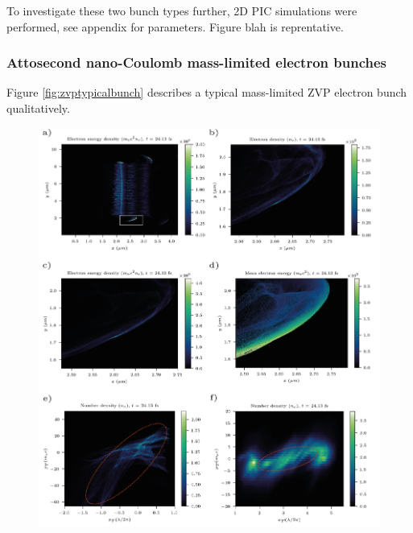  To investigate these two bunch types further, 2D PIC simulations were performed, see appendix for parameters. Figure blah is reprentative.
 
 \subsubsection{Attosecond nano-Coulomb mass-limited electron bunches}
 Figure \ref{fig:zvptypicalbunch} describes a typical mass-limited ZVP electron bunch qualitatively.
\begin{figure}
	\centering
	\includegraphics[width=1\linewidth]{figures/zvp/zvp_typical_bunch}

\end{figure}
